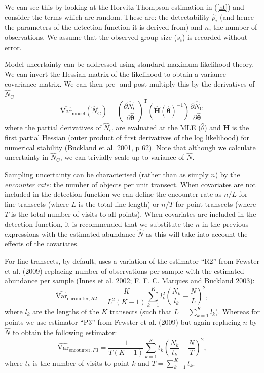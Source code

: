 \documentclass[article]{jss}
\begin{document}
We can see this by looking at the Horvitz-Thompson estimation in
(\ref{ht}) and consider the terms which are random. These are: the
detectability \(\hat{p}_i\) (and hence the parameters of the detection
function it is derived from) and \(n\), the number of observations. We
assume that the observed group size (\(s_i\)) is recorded without error.

Model uncertainty can be addressed using standard maximum likelihood
theory. We can invert the Hessian matrix of the likelihood to obtain a
variance-covariance matrix. We can then pre- and post-multiply this by
the derivatives of \(\hat{N}_\text{C}\) \[
\widehat{\text{Var}}_\text{model}\left( \hat{N}_\text{C}\right) = \left(\frac{\partial \hat{N}_\text{C}}{\partial\hat{\boldsymbol{\theta}}}\right)^\text{T} \left(\hat{\mathbf{H}}(\hat{\boldsymbol{\theta}})^{-1} \right)\frac{\partial \hat{N}_\text{C}}{\partial\hat{\boldsymbol{\theta}}}
\] where the partial derivatives of \(\hat{N}_\text{C}\) are evaluated
at the MLE (\(\hat{\theta}\)) and \(\mathbf{H}\) is the first partial
Hessian (outer product of first derivatives of the log likelihood) for
numerical stability (Buckland et al. 2001, p 62). Note that although we
calculate uncertainty in \(\hat{N}_\text{C}\), we can trivially scale-up
to variance of \(\hat{N}\).

Sampling uncertainty can be characterised (rather than as simply \(n\))
by the \emph{encounter rate}: the number of objects per unit transect.
When covariates are not included in the detection function we can define
the encounter rate as \(n/L\) for line transects (where \(L\) is the
total line length) or \(n/T\) for point transects (where \(T\) is the
total number of visits to all points). When covariates are included in
the detection function, it is recommended that we substitute the \(n\)
in the previous expressions with the estimated abundance \(\hat{N}\) as
this will take into account the effects of the covariates.

For line transects, by default,  uses a variation of the
estimator ``R2'' from Fewster et al. (2009) replacing number of
observations per sample with the estimated abundance per sample (Innes
et al. 2002; F. F. C. Marques and Buckland 2003): \[
\widehat{\text{Var}}_{\text{encounter},R2} = \frac{K}{L^2(K-1)} \sum_{k=1}^{K} l_k^2 \left( \frac{N_k}{l_k} - \frac{N}{L}\right)^2,
\] where \(l_k\) are the lengths of the \(K\) transects (such that
\(L = \sum_{k=1}^K l_k\)). Whereas for points we use estimator ``P3''
from Fewster et al. (2009) but again replacing \(n\) by \(\hat{N}\) to
obtain the following estimator: \[
\widehat{\text{Var}}_{\text{encounter},P3} = \frac{1}{T(K-1)} \sum_{k=1}^{K} t_k \left( \frac{N_k}{t_k} - \frac{N}{T}\right)^2,
\] where \(t_k\) is the number of visits to point \(k\) and
\(T = \sum_{k=1}^K t_k\).
\end{document}
